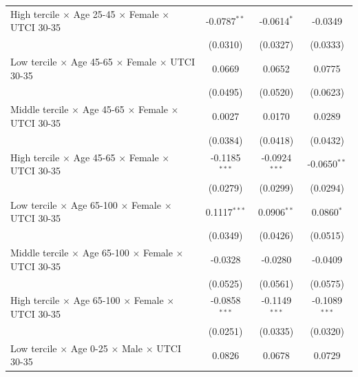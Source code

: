 \begin{table}[htbp]
\begin{tabular}{lccc}
      High tercile $\times$ Age 25-45 $\times$ Female $\times$ UTCI 30-35       & -0.0787$^{**}$  & -0.0614$^{*}$     & -0.0349\\   
                                                                                & (0.0310)        & (0.0327)          & (0.0333)\\   
      Low tercile $\times$ Age 45-65 $\times$ Female $\times$ UTCI 30-35        & 0.0669          & 0.0652            & 0.0775\\   
                                                                                & (0.0495)        & (0.0520)          & (0.0623)\\   
      Middle tercile $\times$ Age 45-65 $\times$ Female $\times$ UTCI 30-35     & 0.0027          & 0.0170            & 0.0289\\   
                                                                                & (0.0384)        & (0.0418)          & (0.0432)\\   
      High tercile $\times$ Age 45-65 $\times$ Female $\times$ UTCI 30-35       & -0.1185$^{***}$ & -0.0924$^{***}$   & -0.0650$^{**}$\\   
                                                                                & (0.0279)        & (0.0299)          & (0.0294)\\   
      Low tercile $\times$ Age 65-100 $\times$ Female $\times$ UTCI 30-35       & 0.1117$^{***}$  & 0.0906$^{**}$     & 0.0860$^{*}$\\   
                                                                                & (0.0349)        & (0.0426)          & (0.0515)\\   
      Middle tercile $\times$ Age 65-100 $\times$ Female $\times$ UTCI 30-35    & -0.0328         & -0.0280           & -0.0409\\   
                                                                                & (0.0525)        & (0.0561)          & (0.0575)\\   
      High tercile $\times$ Age 65-100 $\times$ Female $\times$ UTCI 30-35      & -0.0858$^{***}$ & -0.1149$^{***}$   & -0.1089$^{***}$\\   
                                                                                & (0.0251)        & (0.0335)          & (0.0320)\\   
      Low tercile $\times$ Age 0-25 $\times$ Male $\times$ UTCI 30-35           & 0.0826          & 0.0678            & 0.0729\\   

\end{tabular}
\end{table}
